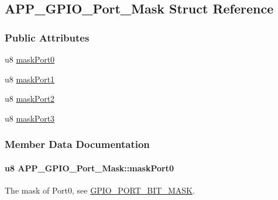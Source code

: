 \hypertarget{struct_a_p_p___g_p_i_o___port___mask}{}\subsection{A\+P\+P\+\_\+\+G\+P\+I\+O\+\_\+\+Port\+\_\+\+Mask Struct Reference}
\label{struct_a_p_p___g_p_i_o___port___mask}
\subsubsection*{Public Attributes}
\begin{DoxyCompactItemize}
\item 
u8 \hyperlink{struct_a_p_p___g_p_i_o___port___mask_a8acac4b748413572a1ba6eff6e797af0}{mask\+Port0}
\item 
u8 \hyperlink{struct_a_p_p___g_p_i_o___port___mask_a668d0ac7f6723ae8f44471e13d7feb28}{mask\+Port1}
\item 
u8 \hyperlink{struct_a_p_p___g_p_i_o___port___mask_a7e6a3e18323c5dc5f42fd1e4a0867754}{mask\+Port2}
\item 
u8 \hyperlink{struct_a_p_p___g_p_i_o___port___mask_a233327841d9ab57dc110d196440f3c4f}{mask\+Port3}
\end{DoxyCompactItemize}


\subsubsection{Member Data Documentation}
\paragraph[{\texorpdfstring{mask\+Port0}{maskPort0}}]{\setlength{\rightskip}{0pt plus 5cm}u8 A\+P\+P\+\_\+\+G\+P\+I\+O\+\_\+\+Port\+\_\+\+Mask\+::mask\+Port0}\hypertarget{struct_a_p_p___g_p_i_o___port___mask_a8acac4b748413572a1ba6eff6e797af0}{}\label{struct_a_p_p___g_p_i_o___port___mask_a8acac4b748413572a1ba6eff6e797af0}
The mask of Port0, see \hyperlink{group___g_p_i_o___p_o_r_t___b_i_t___m_a_s_k}{G\+P\+I\+O\+\_\+\+P\+O\+R\+T\+\_\+\+B\+I\+T\+\_\+\+M\+A\+SK}. 

